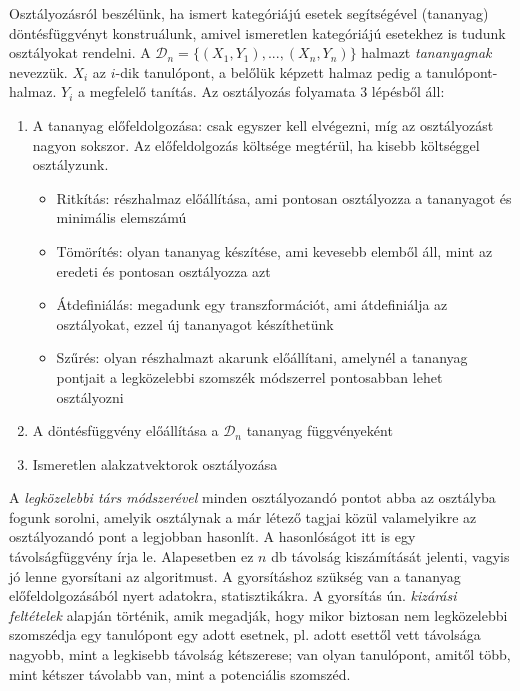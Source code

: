 Osztályozásról beszélünk, ha ismert kategóriájú esetek segítségével (tananyag) döntésfüggvényt konstruálunk, amivel ismeretlen kategóriájú esetekhez is tudunk osztályokat rendelni. A $\mathcal{D}_n = \{ (X_1,Y_1), ..., (X_n,Y_n)\}$ halmazt \emph{tananyagnak} nevezzük. $X_i$ az $i$-dik tanulópont, a belőlük képzett halmaz pedig a tanulópont-halmaz. $Y_i$ a megfelelő tanítás. Az osztályozás folyamata 3 lépésből áll:
\begin{enumerate}
\item A tananyag előfeldolgozása: csak egyszer kell elvégezni, míg az osztályozást nagyon sokszor. Az előfeldolgozás költsége megtérül, ha kisebb költséggel osztályzunk.
\begin{itemize}
\item Ritkítás: részhalmaz előállítása, ami pontosan osztályozza a tananyagot és minimális elemszámú
\item Tömörítés: olyan tananyag készítése, ami kevesebb elemből áll, mint az eredeti és pontosan osztályozza azt
\item Átdefiniálás: megadunk egy transzformációt, ami átdefiniálja az osztályokat, ezzel új tananyagot készíthetünk
\item Szűrés: olyan részhalmazt akarunk előállítani, amelynél a tananyag pontjait a legközelebbi szomszék módszerrel pontosabban lehet osztályozni
\end{itemize}
\item A döntésfüggvény előállítása a $\mathcal{D}_n$ tananyag függvényeként
\item Ismeretlen alakzatvektorok osztályozása
\end{enumerate}

A \emph{legközelebbi társ módszerével} minden osztályozandó pontot abba az osztályba fogunk sorolni, amelyik osztálynak a már létező tagjai közül valamelyikre az osztályozandó pont a legjobban hasonlít. A hasonlóságot itt is egy távolságfüggvény írja le. Alapesetben ez $n$ db távolság kiszámítását jelenti, vagyis jó lenne gyorsítani az algoritmust. A gyorsításhoz szükség van a tananyag előfeldolgozásából nyert adatokra, statisztikákra. A gyorsítás ún. \emph{kizárási feltételek} alapján történik, amik megadják, hogy mikor biztosan nem legközelebbi szomszédja egy tanulópont egy adott esetnek, pl. adott esettől vett távolsága nagyobb, mint a legkisebb távolság kétszerese; van olyan tanulópont, amitől több, mint kétszer távolabb van, mint a potenciális szomszéd.
